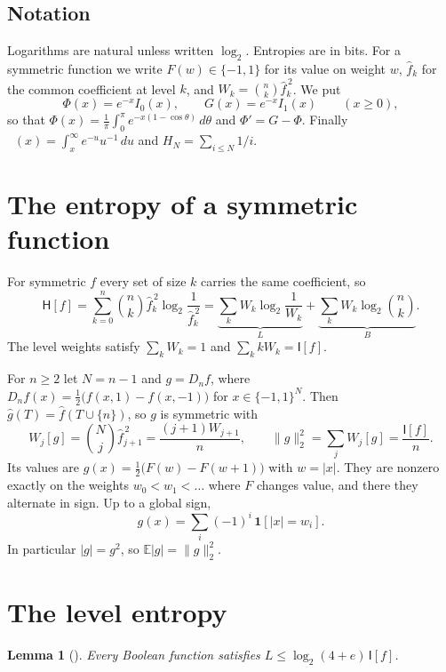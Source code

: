 \documentclass[11pt]{amsart}
\newtheorem{lemma}[theorem]{Lemma}
\theoremstyle{definition}
\theoremstyle{remark}
\newcommand{\bits}{\{-1,1\}}
\newcommand{\E}{\mathbb E}
\newcommand{\HH}{\mathsf H}
\newcommand{\I}{\mathsf I}
\newcommand{\wh}[1]{\widehat{#1}}
\DeclareMathOperator{\Ei}{E_1}
\begin{document}
\subsection*{Notation}
Logarithms are natural unless written $\log_2$. Entropies are in bits. For a symmetric function we write $F(w)\in\bits$ for its value on weight $w$, $\wh f_k$ for the common coefficient at level $k$, and $W_k=\binom nk\wh f_k^{\,2}$. We put
\[
 \Phi(x)=e^{-x}I_0(x),\qquad G(x)=e^{-x}I_1(x)\qquad(x\ge0),
\]
so that $\Phi(x)=\frac1\pi\int_0^\pi e^{-x(1-\cos\theta)}\,d\theta$ and $\Phi'=G-\Phi$. Finally $\Ei(x)=\int_x^\infty e^{-u}u^{-1}\,du$ and $H_N=\sum_{i\le N}1/i$.

\section{The entropy of a symmetric function}\label{sec:split}

For symmetric $f$ every set of size $k$ carries the same coefficient, so
\begin{equation}\label{eq:split}
 \HH[f]=\sum_{k=0}^n\binom nk\wh f_k^{\,2}\log_2\frac{1}{\wh f_k^{\,2}}
 =\underbrace{\sum_kW_k\log_2\frac1{W_k}}_{L}+\underbrace{\sum_kW_k\log_2\binom nk}_{B}.
\end{equation}
The level weights satisfy $\sum_kW_k=1$ and $\sum_kkW_k=\I[f]$.

For $n\ge2$ let $N=n-1$ and $g=D_nf$, where $D_nf(x)=\tfrac12\bigl(f(x,1)-f(x,-1)\bigr)$ for $x\in\bits^N$. Then $\wh g(T)=\wh f(T\cup\{n\})$, so $g$ is symmetric with
\begin{equation}\label{eq:derivative}
 W_j[g]=\binom Nj\wh f_{j+1}^{\,2}=\frac{(j+1)W_{j+1}}{n},\qquad \|g\|_2^2=\sum_jW_j[g]=\frac{\I[f]}n.
\end{equation}
Its values are $g(x)=\tfrac12\bigl(F(w)-F(w+1)\bigr)$ with $w=|x|$. They are nonzero exactly on the weights $w_0<w_1<\dots$ where $F$ changes value, and there they alternate in sign. Up to a global sign,
\begin{equation}\label{eq:alternating}
 g(x)=\sum_{i}(-1)^i\,\mathbf 1[|x|=w_i].
\end{equation}
In particular $|g|=g^2$, so $\E|g|=\|g\|_2^2$.

\section{The level entropy}\label{sec:level}

\begin{lemma}[{\cite[Lemma~2.1]{Shm26}}]\label{lem:level}
Every Boolean function satisfies $L\le\log_2(4+e)\,\I[f]$.
\end{lemma}
\end{document}

